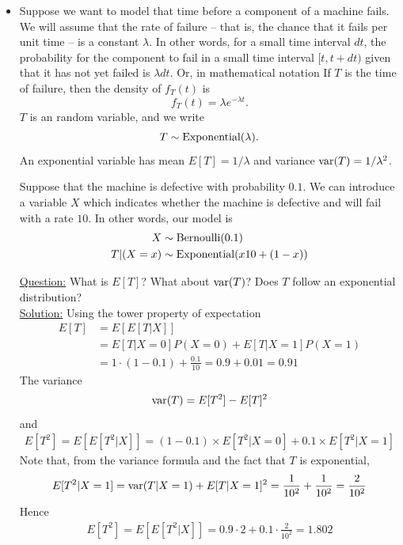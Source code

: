 \begin{itemize}
\item Suppose we want to model that time before a component of a machine fails. We will assume that the rate of failure -- that is, the chance that it fails per unit time -- is a constant $\lambda$. In other words, for a small time interval $dt$, the probability for the component to fail in a small time interval $[t,t+dt)$ given that it has not yet failed is $\lambda dt$. Or, in mathematical notation 
 If $T$ is the time of failure, then the density of $f_T(t)$ is 
\begin{equation*}
f_T(t) = \lambda e^{-\lambda t}.
\end{equation*}
$T$ is an  random variable, and we write
\begin{equation*}
T \sim {\rm Exponential}(\lambda).
\end{equation*}
An exponential variable has mean $E[T] = 1/\lambda$ and variance ${\rm var}(T) = 1/\lambda^2$. 



\begin{example}

Suppose that the machine is defective with probability $0.1$. We can introduce a variable $X$ which indicates whether the machine is defective and will fail with a rate $10$. In other words, our model is 
\begin{align*}
X &\sim {\rm Bernoulli}(0.1)\\
T|(X=x) &\sim {\rm Exponential}(x10 + (1-x))
\end{align*}


\noindent
\underline{Question:} What is $E[T]$? What about ${\rm var}(T)$? Does $T$ follow an exponential distribution?\\ 


\noindent
\underline{Solution:} Using the tower property of expectation
\begin{align*}
E[T] &= E[E[T|X]] \\
&= E[T|X=0]P(X=0) + E[T|X=1]P(X=1) \\
&= 1 \cdot (1-0.1) + \frac{0.1}{10} = 0.9+0.01 = 0.91
\end{align*}
The variance 
\begin{equation*}
{\rm var}(T) = E[T^2]-E[T]^2
\end{equation*}
and 
\begin{align*}
E[T^2] = E[E[T^2|X]]  = (1-0.1)\times E[T^2|X=0] + 0.1 \times E[T^2|X=1] 
\end{align*}
Note that, from the variance formula and the fact that $T$ is exponential,
\begin{equation*}
E[T^2|X=1]  = {\rm var}(T|X=1) + E[T|X=1]^2 = \frac{1}{10^2}  + \frac{1}{10^2} = \frac{2}{10^2}
\end{equation*}
Hence 
\begin{align*}
E[T^2] = E[E[T^2|X]]  = 0.9 \cdot 2 + 0.1 \cdot \frac{2}{10^2} = 1.802
\end{align*}



\end{example}
\end{itemize}
